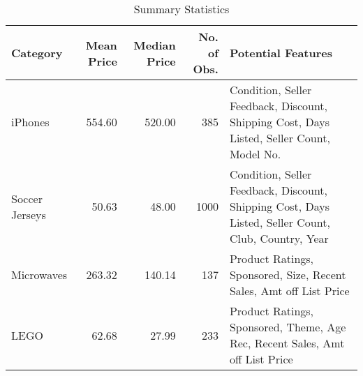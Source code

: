 \documentclass[border=1mm]{standalone}
\begin{document}
\begin{table}
\centering
\caption{\label{tab:unnamed-chunk-22}Summary Statistics}
\centering
\begin{tabular}[t]{l|r|r|r|l}
\hline
Category & Mean Price & Median Price & No. of Obs. & Potential Features\\
\hline
iPhones & 554.60 & 520.00 & 385 & Condition, Seller Feedback, Discount, Shipping Cost, Days Listed, Seller Count, Model No.\\
\hline
Soccer Jerseys & 50.63 & 48.00 & 1000 & Condition, Seller Feedback, Discount, Shipping Cost, Days Listed, Seller Count, Club, Country, Year\\
\hline
Microwaves & 263.32 & 140.14 & 137 & Product Ratings, Sponsored, Size, Recent Sales, Amt off List Price\\
\hline
LEGO & 62.68 & 27.99 & 233 & Product Ratings, Sponsored, Theme, Age Rec, Recent Sales, Amt off List Price\\
\hline
\end{tabular}
\end{table}
\end{document}
